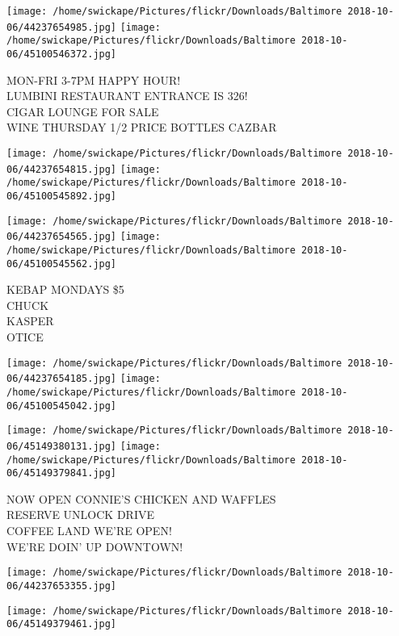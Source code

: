 \documentclass[10pt,letterpaper]{article}
\begin{document}
\texttt{[image: /home/swickape/Pictures/flickr/Downloads/Baltimore 2018-10-06/44237654985.jpg]}
\texttt{[image: /home/swickape/Pictures/flickr/Downloads/Baltimore 2018-10-06/45100546372.jpg]}

MON{-}FRI 3{-}7PM HAPPY HOUR!\\
LUMBINI RESTAURANT ENTRANCE IS 326!\\
CIGAR LOUNGE FOR SALE\\
WINE THURSDAY 1/2 PRICE BOTTLES CAZBAR\\
\pagebreak

\texttt{[image: /home/swickape/Pictures/flickr/Downloads/Baltimore 2018-10-06/44237654815.jpg]}
\texttt{[image: /home/swickape/Pictures/flickr/Downloads/Baltimore 2018-10-06/45100545892.jpg]}

\texttt{[image: /home/swickape/Pictures/flickr/Downloads/Baltimore 2018-10-06/44237654565.jpg]}
\texttt{[image: /home/swickape/Pictures/flickr/Downloads/Baltimore 2018-10-06/45100545562.jpg]}

KEBAP MONDAYS \$5\\
CHUCK\\
KASPER\\
OTICE\\
\pagebreak

\texttt{[image: /home/swickape/Pictures/flickr/Downloads/Baltimore 2018-10-06/44237654185.jpg]}
\texttt{[image: /home/swickape/Pictures/flickr/Downloads/Baltimore 2018-10-06/45100545042.jpg]}

\texttt{[image: /home/swickape/Pictures/flickr/Downloads/Baltimore 2018-10-06/45149380131.jpg]}
\texttt{[image: /home/swickape/Pictures/flickr/Downloads/Baltimore 2018-10-06/45149379841.jpg]}

NOW OPEN CONNIE'S CHICKEN AND WAFFLES\\
RESERVE UNLOCK DRIVE\\
COFFEE LAND WE'RE OPEN!\\
WE'RE DOIN' UP DOWNTOWN!\\
\pagebreak

\texttt{[image: /home/swickape/Pictures/flickr/Downloads/Baltimore 2018-10-06/44237653355.jpg]}

\vspace{0.25in}
\texttt{[image: /home/swickape/Pictures/flickr/Downloads/Baltimore 2018-10-06/45149379461.jpg]}
\end{document}
